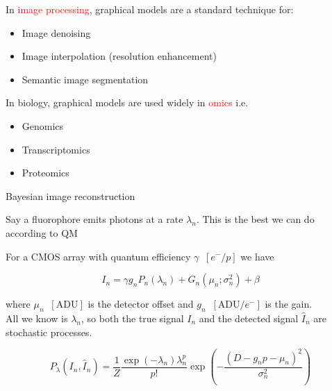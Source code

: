 \documentclass{beamer}					%
\begin{document}
\begin{frame}

In \textcolor{red}{image processing}, graphical models are a standard technique for:

\begin{itemize}
\item Image denoising
\item Image interpolation (resolution enhancement)
\item Semantic image segmentation
\end{itemize}

\vspace{0.2in}
In biology, graphical models are used widely in \textcolor{red}{omics} i.e.

\begin{itemize}
\item Genomics
\item Transcriptomics
\item Proteomics
\end{itemize}

\end{frame}

\begin{frame}{Bayesian image reconstruction}

Say a fluorophore emits photons at a rate $\lambda_{n}$. This is the best we can do according to QM
\vspace{0.1in}

For a CMOS array with quantum efficiency $\gamma\;\;[e^{-}/p]$ we have

\begin{equation*}
I_{n} = \gamma g_{n}P_{n}(\lambda_{n}) + G_{n}(\mu_{n};\sigma_{n}^{2}) + \beta
\end{equation*}

where $\mu_{n} \;\;[\mathrm{ADU}]$ is the detector offset and $g_{n}\;\; [\mathrm{ADU}/e^{-}]$ is the gain. \\
\vspace{0.2in}
All we know is $\lambda_{n}$, so both the true signal $I_{n}$ and the detected signal $\hat{I}_{n}$ are stochastic processes. 

\begin{equation*}
P_{\lambda}(I_{n},\hat{I}_{n}) = \frac{1}{Z}\frac{\exp\left({-\lambda_{n}}\right)\lambda_{n}^{p}}{p!}\exp\left(-\frac{(D-g_{n}p-\mu_{n})^{2}}{\sigma_{n}^{2}}\right)
\end{equation*}

\end{frame}
\end{document}
